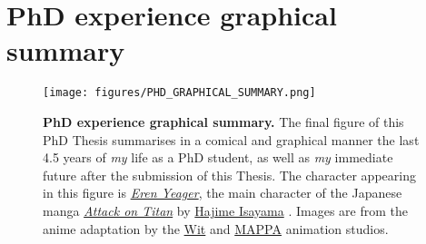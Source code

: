 \chapter*{PhD experience graphical summary}

\renewcommand{\thefigure}{U.\arabic{figure}}

\begin{figure}[htb!]
    \centering
    \texttt{[image: figures/PHD\_GRAPHICAL\_SUMMARY.png]}
    \caption[PhD experience graphical summary]{\textbf{PhD experience graphical summary.} The final figure of this PhD Thesis summarises in a comical and graphical manner the last 4.5 years of \textit{my} life as a PhD student, as well as \textit{my} immediate future after the submission of this Thesis. The character appearing in this figure is \href{https://attackontitan.fandom.com/wiki/Eren_Yeager}{\textit{Eren Yeager}}, the main character of the Japanese manga \href{https://en.wikipedia.org/wiki/Attack_on_Titan}{\textit{Attack on Titan}} by \href{https://en.wikipedia.org/wiki/Hajime_Isayama}{Hajime Isayama} \cite{ISAYAMA_2021}. Images are from the anime adaptation by the \href{https://en.wikipedia.org/wiki/Wit_Studio}{Wit} and \href{https://en.wikipedia.org/wiki/MAPPA}{MAPPA} animation studios.}
    \label{fig:phd_graph_summary}
\end{figure}